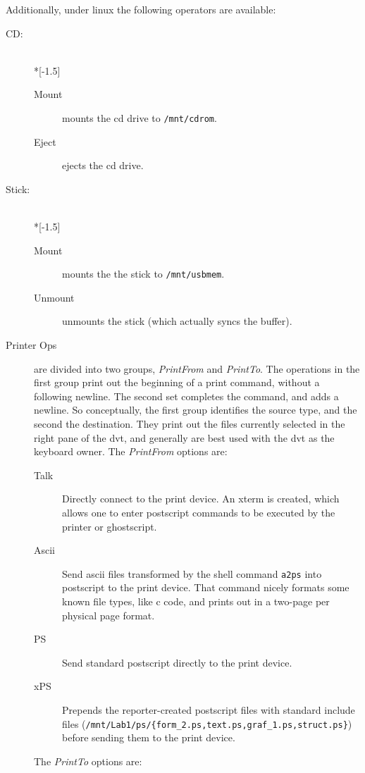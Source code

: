 \documentclass[12pt]{article}
\begin{document}
Additionally, under linux the following operators are available:
\begin{description}
  \item[CD:]\ \\*[-1.5\baselineskip]
  \begin{description}
    \item[Mount] mounts the cd drive to \texttt{/mnt/cdrom}.
    \item[Eject] ejects the cd drive.
  \end{description}
  \item[Stick:]\ \\*[-1.5\baselineskip]
  \begin{description}
    \item[Mount] mounts the the stick to \texttt{/mnt/usbmem}.
    \item[Unmount] unmounts the stick (which actually syncs the
    buffer).
  \end{description}
  \item[Printer Ops] are divided into two groups, \emph{PrintFrom} and
  \emph{PrintTo}. The operations in the first group print out the
  beginning of a print command, without a following newline. The
  second set completes the command, and adds a newline. So
  conceptually, the first group identifies the source type, and the
  second the destination. They print out the files currently selected
  in the right pane of the dvt, and generally are best used with the
  dvt as the keyboard owner. The \emph{PrintFrom} options are:
  \begin{description}
    \item[Talk] Directly connect to the print device. An xterm is
    created, which allows one to enter postscript commands to be
    executed by the printer or ghostscript.
    \item[Ascii] Send ascii files transformed by the shell command
    \texttt{a2ps} into postscript to the print device. That command
    nicely formats some known file types, like c code, and prints out
    in a two-page per physical page format.
    \item[PS] Send standard postscript directly to the print device.
    \item[xPS] Prepends the reporter-created postscript files with
    standard include files
    (\texttt{/mnt/Lab1/ps/\{form\_2.ps,text.ps,graf\_1.ps,struct.ps\}})
    before sending them to the print device.
  \end{description}
  The \emph{PrintTo} options are:
  \begin{description}

\end{description}
\end{description}
\end{document}
